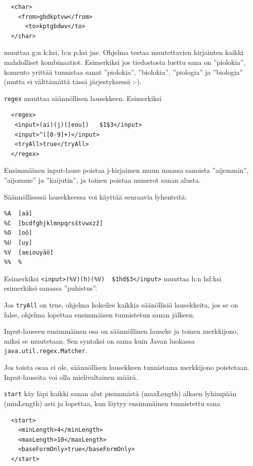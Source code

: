 \documentclass[12pt]{article}
\begin{document}
\begin{verbatim}
  <char>
    <from>gbdkptvw</from>
      <to>kptgbdwv</to>
  </char>
\end{verbatim}

muuttaa g:n k:ksi, b:n p:ksi jne. Ohjelma testaa muutettavien
kirjainten kaikki mahdolliset kombinaatiot. Esimerkiksi jos
tiedostosta luettu sana on ''piolokia'', komento yrittää tunnistaa
sanat ''piolokia'', ''biolokia'', ''piologia'' ja ''biologia'' (mutta
ei välttämättä tässä järjestyksessä :-).




\verb|regex| muuttaa säännöllisen lausekkeen. Esimerkiksi

\begin{verbatim}
  <regex>
   <input>(ai)(j)([eou])   $1$3</input>
   <input>^([0-9]+)</input>
   <tryAll>true</tryAll>
  </regex>
\end{verbatim}

Ensimmäinen input-lause poistaa j-kirjaimen muun muassa sanoista
''aijemmin'', ''aijomme'' ja ''kaijutin'', ja toinen poistaa numerot
sanan alusta.


Säännöllisessä lausekkeessa voi käyttää seuraavia lyhenteitä:

\begin{verbatim}
%A  [aä]
%C  [bcdfghjklmnpqrsštvwxzž]
%O  [oö]
%U  [uy]
%V  [aeiouyäö]
%%  %
\end{verbatim}

Esimerkiksi \verb=<input>(%V)(h)(%V)  $1hd$3</input>=
muuttaa h:n hd:ksi esimerkiksi sanassa ''puhistus''.


Jos \verb=tryAll= on true, ohjelma kokeilee kaikkia säänöllisiä
lausekkeita, jos se on false, ohjelma lopettaa ensimmäisen tunnistetun
sanan jälkeen.

Input-lauseen ensimmäinen osa on säännöllinen lauseke ja toinen
merkkijono, miksi se muutetaan. Sen syntaksi on sama kuin Javan
luokassa \verb=java.util.regex.Matcher=.

Jos toista osaa ei ole, säännöllisen lausekkeen tunnistama merkkijono
poistetaan. Input-lauseita voi olla mielivaltainen määrä.




\bigskip
\verb=start= käy läpi kaikki sanan alut pisimmästä (maxLength) alkaen
lyhimpään (minLength) asti ja lopettaa, kun löytyy ensimmäinen
tunnistettu sana

\begin{verbatim}
  <start>
    <minLength>4</minLength>
    <maxLength>10</maxLength>
    <baseFormOnly>true</baseFormOnly>
  </start>
\end{verbatim}
\end{document}
